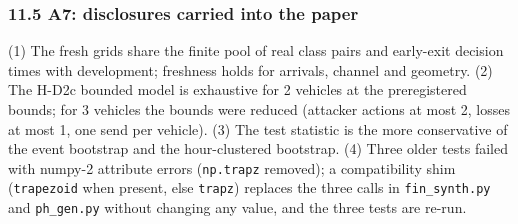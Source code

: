 \subsubsection*{11.5 A7: disclosures carried into the paper}
(1) The fresh grids share the finite pool of real class pairs and early-exit decision times with development; freshness holds for arrivals, channel and geometry. (2) The H-D2c bounded model is exhaustive for 2 vehicles at the preregistered bounds; for 3 vehicles the bounds were reduced (attacker actions at most 2, losses at most 1, one send per vehicle). (3) The test statistic is the more conservative of the event bootstrap and the hour-clustered bootstrap. (4) Three older tests failed with numpy-2 attribute errors (\texttt{np.trapz} removed); a compatibility shim (\texttt{trapezoid} when present, else \texttt{trapz}) replaces the three calls in \texttt{fin\_synth.py} and \texttt{ph\_gen.py} without changing any value, and the three tests are re-run.

